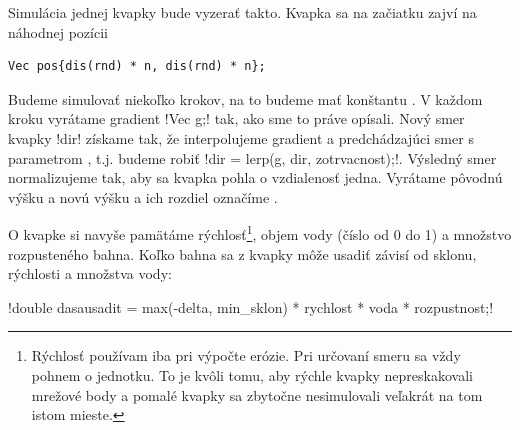 {}



Simulácia jednej kvapky bude vyzerať takto. Kvapka sa na začiatku zajví na náhodnej pozícii

\begin{lstlisting}
Vec pos{dis(rnd) * n, dis(rnd) * n};
\end{lstlisting}

Budeme simulovať niekoľko krokov, na
to budeme mať konštantu . V každom kroku vyrátame gradient \prg!Vec g;!
tak, ako sme to práve opísali. Nový smer kvapky \prg!dir! získame tak, že interpolujeme
gradient a predchádzajúci smer s parametrom , t.j. budeme robiť
\prg!dir = lerp(g, dir, zotrvacnost);!. Výsledný smer normalizujeme tak, aby sa 
kvapka pohla o vzdialenosť jedna. 
Vyrátame pôvodnú výšku a novú výšku a 
ich rozdiel označíme .


O kvapke si navyše pamätáme rýchlosť\footnote{%
  Rýchlosť používam iba pri výpočte erózie. Pri určovaní smeru sa vždy pohnem o jednotku.
  To je kvôli tomu, aby rýchle kvapky nepreskakovali mrežové body a pomalé kvapky sa zbytočne
  nesimulovali veľakrát na tom istom mieste.},
  objem vody (číslo od 0 do 1) a množstvo rozpusteného bahna.
 Koľko bahna sa z kvapky môže usadiť závisí od sklonu, rýchlosti a množstva vody:

 
 \centerline{
   \prg!double dasausadit =  max(-delta, min_sklon) * rychlost * voda * rozpustnost;!} 


